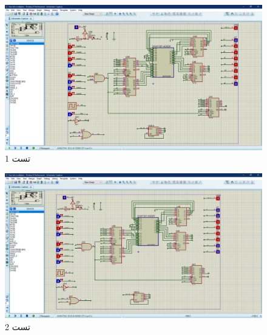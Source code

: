 \documentclass[fleqn]{article}
\begin{document}
\begin{figure}[!htbp]
    \includegraphics[width=\textwidth]{Assets/test1.jpg}
    \caption{تست 1}
    \label{test1}
\end{figure}

\begin{figure}[!htbp]
    \includegraphics[width=\textwidth]{Assets/test2.jpg}
    \caption{تست 2}
    \label{test2}
\end{figure}
\end{document}
